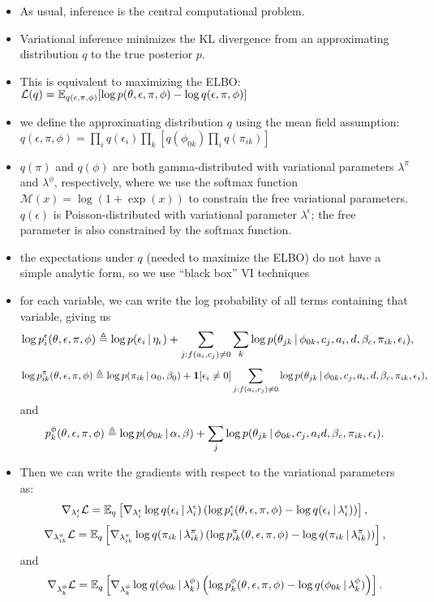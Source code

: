 \begin{itemize}
\item As usual, inference is the central computational problem.
\item Variational inference minimizes the KL divergence from an approximating distribution $q$ to the true posterior $p$.
\item This is equivalent to maximizing the ELBO: $\mathcal{L}(q)  = \mathbb{E}_{q(\epsilon, \pi, \phi)}[\log p(\theta,\epsilon,\pi,\phi) - \log q(\epsilon, \pi, \phi)]$
\item we define the approximating distribution $q$ using the mean field assumption: $q(\epsilon, \pi, \phi) = \prod_i q(\epsilon_{i})\prod_k\left[q(\phi_{0k})\prod_i q(\pi_{ik})\right]$ 
\item $q(\pi)$ and $q(\phi)$ are both gamma-distributed with variational parameters $\lambda^\pi$ and $\lambda^\phi$, respectively, where we use the softmax function $\mathcal{M}(x) = \log(1+\exp(x))$ to constrain the free variational parameters.
$q(\epsilon)$ is Poisson-distributed with variational parameter $\lambda^\epsilon$; the free parameter is also constrained by the softmax function.

\item the expectations under $q$ (needed to maximize the ELBO) do not have a simple analytic form, so we use ``black box'' VI techniques
\item for each variable, we can write the log probability of all terms containing that variable, giving us 
\[\log p^\epsilon_{i}(\theta, \epsilon, \pi, \phi) \triangleq \log p(\epsilon_{i} \, | \, \eta_\epsilon) + \sum_{j : f(a_i, c_j) \neq 0}\sum_k\log p(\theta_{jk} \, | \, \phi_{0k}, c_j, a_i, d, \beta_c, \pi_{ik}, \epsilon_i),\]
\[\log p^\pi_{ik}(\theta, \epsilon, \pi, \phi) \triangleq \log p(\pi_{ik} \, | \, \alpha_0, \beta_0) + \mathbf{1}[\epsilon_i \neq 0] \sum_{j : f(a_i, c_j) \neq 0}\log p(\theta_{jk} \, | \, \phi_{0k}, c_j, a_i, d, \beta_c, \pi_{ik}, \epsilon_i),\]
and
\[p^\phi_{k}(\theta, \epsilon, \pi, \phi) \triangleq \log p(\phi_{0k} \, | \, \alpha, \beta) + \sum_{j} \log p(\theta_{jk} \, | \, \phi_{0k}, c_j, a_i d, \beta_c, \pi_{ik}, \epsilon_i).\]
\item Then we can write the gradients with respect to the variational parameters as:
\[\nabla_{\lambda^\epsilon_{i}} \mathcal{L} = \mathbb{E}_q \left[ \nabla_{\lambda^\epsilon_{i}} \log q(\epsilon_{i} \, | \, \lambda^\epsilon_{i}) \left( \log p^\epsilon_{i}(\theta, \epsilon, \pi, \phi) - \log q(\epsilon_{i} \, | \, \lambda^\epsilon_{i}) \right)\right],\]
\[\nabla_{\lambda^\pi_{ik}} \mathcal{L} = \mathbb{E}_q \left[ \nabla_{\lambda^\pi_{ik}} \log q(\pi_{ik} \, | \, \lambda^\pi_{ik}) \left( \log p^\pi_{ik}(\theta, \epsilon, \pi, \phi) - \log q(\pi_{ik} \, | \, \lambda^\pi_{ik}) \right)\right],\]
and
\[\nabla_{\lambda^\phi_{k}} \mathcal{L} = \mathbb{E}_q \left[ \nabla_{\lambda^\phi_{k}} \log q(\phi_{0k} \, | \, \lambda^\phi_{k}) \left( \log p^\phi_{k}(\theta, \epsilon, \pi, \phi) - \log q(\phi_{0k} \, | \, \lambda^\phi_{k}) \right)\right].\]
\end{itemize}


